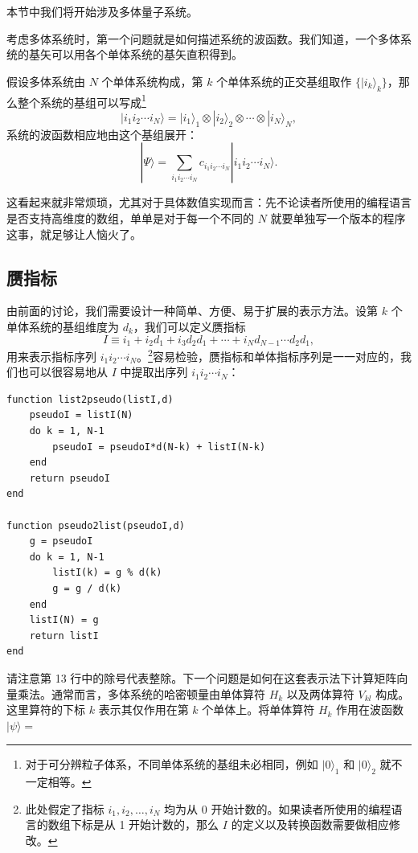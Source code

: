 本节中我们将开始涉及多体量子系统。

考虑多体系统时，第一个问题就是如何描述系统的波函数。我们知道，一个多体系统的基矢可以用各个单体系统的基矢直积得到。

假设多体系统由 $N$ 个单体系统构成，第 $k$ 个单体系统的正交基组取作 $\{|i_k\rangle_k\}$，那么整个系统的基组可以写成\footnote{对于可分辨粒子体系，不同单体系统的基组未必相同，例如 $|0\rangle_1$ 和 $|0\rangle_2$ 就不一定相等。}
\begin{equation}
 |i_1i_2\cdots i_N\rangle=|i_1\rangle_1\otimes|i_2\rangle_2\otimes\cdots\otimes|i_N\rangle_N,
\tag{6.3.1}
\end{equation}
系统的波函数相应地由这个基组展开：
\begin{equation}
 |\Psi\rangle=\sum_{i_1i_2\cdots i_N}c_{i_1i_2\cdots i_N}|i_1i_2\cdots i_N\rangle.
\tag{6.3.2}
\end{equation}

这看起来就非常烦琐，尤其对于具体数值实现而言：先不论读者所使用的编程语言是否支持高维度的数组，单单是对于每一个不同的 $N$ 就要单独写一个版本的程序这事，就足够让人恼火了。

\subsection{赝指标}

由前面的讨论，我们需要设计一种简单、方便、易于扩展的表示方法。设第 $k$ 个单体系统的基组维度为 $d_k$，我们可以定义赝指标
\begin{equation}
 I\equiv i_1+i_2d_1+i_3d_2d_1+\cdots+i_Nd_{N-1}\cdots d_2d_1,
\tag{6.3.3}
\end{equation}
用来表示指标序列 $i_1i_2\cdots i_N$。\footnote{此处假定了指标 $i_1,i_2,\ldots,i_N$ 均为从 0 开始计数的。如果读者所使用的编程语言的数组下标是从 1 开始计数的，那么 $I$ 的定义以及转换函数需要做相应修改。}容易检验，赝指标和单体指标序列是一一对应的，我们也可以很容易地从 $I$ 中提取出序列 $i_1i_2\cdots i_N$：

\begin{lstlisting}[style=bellacode]
function list2pseudo(listI,d)
    pseudoI = listI(N)
    do k = 1, N-1
        pseudoI = pseudoI*d(N-k) + listI(N-k)
    end
    return pseudoI
end

function pseudo2list(pseudoI,d)
    g = pseudoI
    do k = 1, N-1
        listI(k) = g % d(k)
        g = g / d(k)
    end
    listI(N) = g
    return listI
end
\end{lstlisting}

请注意第 13 行中的除号代表整除。下一个问题是如何在这套表示法下计算矩阵向量乘法。通常而言，多体系统的哈密顿量由单体算符 $H_k$ 以及两体算符 $V_{kl}$ 构成。这里算符的下标 $k$ 表示其仅作用在第 $k$ 个单体上。将单体算符 $H_k$ 作用在波函数 $|\psi\rangle=$

